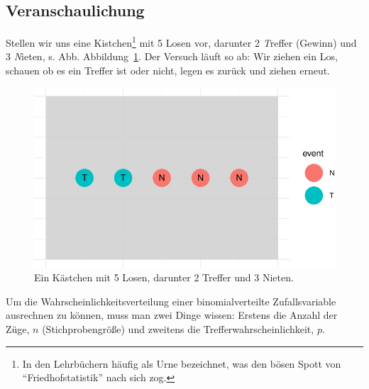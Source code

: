 \documentclass[
  a4paper,
  DIV=11]{scrreprt}
\theoremstyle{definition}
\theoremstyle{remark}
\begin{document}
\hypertarget{veranschaulichung}{%
\subsection{Veranschaulichung}\label{veranschaulichung}}

Stellen wir uns eine Kistchen\footnote{In den Lehrbüchern häufig als
  Urne bezeichnet, was den bösen Spott von ``Friedhofstatistik'' nach
  sich zog.} mit 5 Losen vor, darunter 2 \emph{T}reffer (Gewinn) und 3
\emph{N}ieten, s. Abb. Abbildung~\ref{fig-urne}. Der Versuch läuft so
ab: Wir ziehen ein Los, schauen ob es ein Treffer ist oder nicht, legen
es zurück und ziehen erneut.

\begin{figure}

{\centering \includegraphics{./Verteilungen_files/figure-pdf/fig-urne-1.pdf}

}

\caption{\label{fig-urne}Ein Kästchen mit 5 Losen, darunter 2 Treffer
und 3 Nieten.}

\end{figure}

\begin{tcolorbox}[enhanced jigsaw, leftrule=.75mm, left=2mm, bottomrule=.15mm, opacityback=0, coltitle=black, colbacktitle=quarto-callout-important-color!10!white, opacitybacktitle=0.6, rightrule=.15mm, toptitle=1mm, colback=white, colframe=quarto-callout-important-color-frame, arc=.35mm, toprule=.15mm, breakable, titlerule=0mm, bottomtitle=1mm, title=\textcolor{quarto-callout-important-color}{\faExclamation}\hspace{0.5em}{Wichtig}]
Um die Wahrscheinlichkeitsverteilung einer binomialverteilte
Zufallsvariable ausrechnen zu können, muss man zwei Dinge wissen:
Erstens die Anzahl der Züge, \(n\) (Stichprobengröße) und zweitens die
Trefferwahrscheinlichkeit, \(p\).
\end{tcolorbox}
\end{document}
